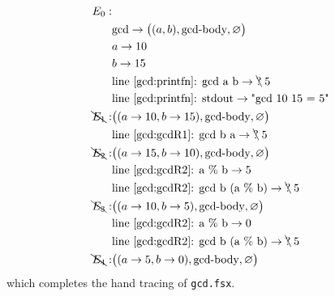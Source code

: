 \begin{align*}
  E_0:&\\
      & \text{gcd} \rightarrow \big((a, b), \text{gcd-body}, \varnothing\big)\\
      & a \rightarrow 10\\
      & b \rightarrow 15\\
      & \text{line~\ref{gcd:printfn}: gcd a b} \rightarrow \bcancel{\text{?}}\; 5\\
      & \text{line~\ref{gcd:printfn}: stdout} \rightarrow \text{"gcd 10 15 = 5"}\\
  \bcancel{E_1}:& \big((a \rightarrow 10, b \rightarrow 15), \text{gcd-body}, \varnothing\big)\\
      & \text{line~\ref{gcd:gcdR1}: gcd b a} \rightarrow \bcancel{\text{?}}\; 5\\
  \bcancel{E_2}:& \big((a \rightarrow 15, b \rightarrow 10), \text{gcd-body}, \varnothing\big)\\
      & \text{line~\ref{gcd:gcdR2}: a \% b} \rightarrow 5\\
      & \text{line~\ref{gcd:gcdR2}: gcd b (a \% b)} \rightarrow \bcancel{\text{?}}\; 5\\
  \bcancel{E_3}:& \big((a \rightarrow 10, b \rightarrow 5), \text{gcd-body}, \varnothing\big)\\
      & \text{line~\ref{gcd:gcdR2}: a \% b} \rightarrow 0\\
      & \text{line~\ref{gcd:gcdR2}: gcd b (a \% b)} \rightarrow \bcancel{\text{?}}\; 5\\
  \bcancel{E_4}:& \big((a \rightarrow 5, b \rightarrow 0), \text{gcd-body}, \varnothing\big)\\
\end{align*}
which completes the hand tracing of \lstinline[language=console]{gcd.fsx}.

